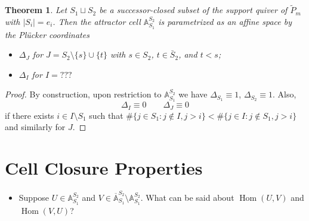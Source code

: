 \documentclass{amsart}
\newtheorem{theorem}{Theorem}
\numberwithin{equation}{section}
\renewcommand{\AA}{\mathbb{A}}
\newcommand{\Hom}{\operatorname{Hom}}
\begin{document}
  \begin{theorem}
    Let $S_1\sqcup S_2$ be a successor-closed subset of the support quiver of $\tilde P_m$ with $|S_i|=e_i$.
    Then the attractor cell $\AA_{S_1}^{S_2}$ is parametrized as an affine space by the Pl\"ucker coordinates
    \begin{itemize}
      \item $\Delta_J$ for $J=S_2\setminus\{s\}\cup\{t\}$ with $s\in S_2$, $t\in\bar{S}_2$, and $t<s$;
      \item $\Delta_I$ for $I=???$
    \end{itemize}
  \end{theorem}
  \begin{proof}
    By construction, upon restriction to $\AA_{S_1}^{S_2}$ we have $\Delta_{S_1}\equiv 1$, $\Delta_{S_2}\equiv 1$.
    Also,
    \[\Delta_I\equiv 0 \qquad \Delta_J\equiv 0\]
    if there exists $i\in I\setminus S_1$ such that $\#\{j\in S_1:j\notin I, j>i\} < \#\{j\in I:j\notin S_1,j>i\}$ and similarly for $J$.
  \end{proof}

\section{Cell Closure Properties}

  \begin{itemize}
    \item Suppose $U\in\AA_{S_1}^{S_2}$ and $V\in\overline{\AA}_{S_1}^{S_2}\setminus\AA_{S_1}^{S_2}$.
      What can be said about $\Hom(U,V)$ and $\Hom(V,U)$?
  \end{itemize}
\end{document}
